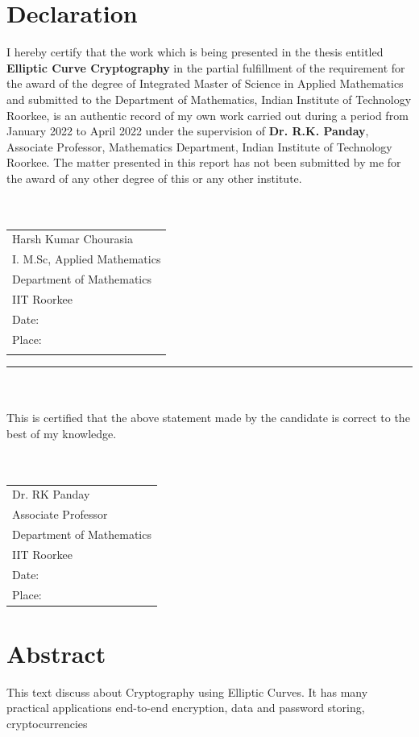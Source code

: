 \documentclass[12pt,a4paper]{report}
\begin{document}
\section*{Declaration}
I hereby certify that the work which is being presented in the thesis entitled \textbf{Elliptic Curve Cryptography} in the partial fulfillment of the requirement
for the award of the degree of Integrated Master of Science in Applied Mathematics
and submitted to the Department of Mathematics, Indian Institute of Technology
Roorkee, is an authentic record of my own work carried out during a period from
January 2022 to April 2022 under the supervision of \textbf{Dr. R.K. Panday}, Associate Professor, Mathematics Department, Indian Institute of Technology Roorkee.
The matter presented in this report has not been submitted by me for the
award of any other degree of this or any other institute.\\\\\\
 
\begin{tabular}{l}
Harsh Kumar Chourasia\\
I. M.Sc, Applied Mathematics\\
Department of Mathematics\\
IIT Roorkee\\
Date:\\
Place:\\
\bigskip 
\end{tabular}
\hrule  
\bigskip 
\bigskip 
{} \\\\
This is certified that the above statement made by the candidate is correct to the best of my knowledge.\\\\\\
\vspace{1cm}
\begin{tabular}{l}
Dr. RK Panday\\
Associate Professor\\
Department of Mathematics\\
IIT Roorkee\\
Date:\\
Place:\\
\end{tabular}
\cleardoublepage	
\section*{Abstract}
This text discuss about Cryptography using Elliptic Curves. It has many practical applications end-to-end encryption, data and password storing, cryptocurrencies
\cleardoublepage
\end{document}
